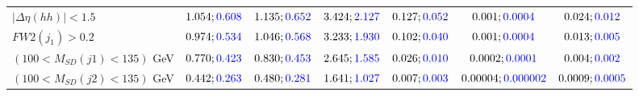\begin{landscape}
\begin{table}
\begin{tabular}{lcccccc}
				\rowcolor{black!7}$|\Delta\eta(hh)|<1.5$& $1.054;\textcolor{blue}{0.608}$&$1.135;\textcolor{blue}{0.652}$ &$3.424;\textcolor{blue}{2.127}$ &$0.127;\textcolor{blue}{0.052}$ &$0.001;\textcolor{blue}{0.0004}$ &$0.024;\textcolor{blue}{0.012}$\\
				$FW2(j_1)>0.2$ &$0.974;\textcolor{blue}{0.534}$ &$1.046;\textcolor{blue}{0.568}$&$3.233;\textcolor{blue}{1.930}$&$0.102;\textcolor{blue}{0.040}$&$0.001;\textcolor{blue}{0.0004}$&$0.013;\textcolor{blue}{0.005}$\\
				\rowcolor{black!7}$(100<M_{SD}(j1)<135)$ GeV& $0.770;\textcolor{blue}{0.423}$&$0.830;\textcolor{blue}{0.453}$&$2.645;\textcolor{blue}{1.585}$&$0.026;\textcolor{blue}{0.010}$&$0.0002;\textcolor{blue}{0.0001}$&$0.004;\textcolor{blue}{0.002}$\\
				$(100<M_{SD}(j2)<135)$ GeV &$0.442;\textcolor{blue}{0.263}$ &$0.480;\textcolor{blue}{0.281}$ &$1.641;\textcolor{blue}{1.027}$&$0.007;\textcolor{blue}{0.003}$&$0.00004;\textcolor{blue}{0.000002}$&$0.0009;\textcolor{blue}{0.0005}$\\
				\bottomrule
			\end{tabular}
		\end{table}
		

\end{landscape}
